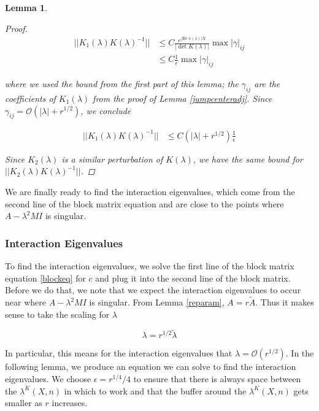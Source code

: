 \documentclass[12pt]{article}
\newtheorem{lemma}{Lemma}
\begin{document}
\begin{lemma}
\begin{proof}
\begin{align*}
||K_1(\lambda)K(\lambda)^{-1}|| &\leq 
C \frac{e^{|\text{Re }\nu(\lambda)|X}}{|\det K(\lambda)|} \max {|\gamma|_{ij}} \\
&\leq C \frac{1}{\epsilon} \max {|\gamma|_{ij}}
\end{align*}

where we used the bound from the first part of this lemma; the $\gamma_{ij}$ are the coefficients of $K_1(\lambda)$ from the proof of Lemma \ref{jumpcenteradj}. Since $\gamma_{ij} = \mathcal{O}(|\lambda| + r^{1/2})$, we conclude

\begin{align*}
||K_1(\lambda)K(\lambda)^{-1}|| &\leq C (|\lambda| + r^{1/2})\frac{1}{\epsilon}
\end{align*}

Since $K_2(\lambda)$ is a similar perturbation of $K(\lambda)$, we have the same bound for $||K_2(\lambda)K(\lambda)^{-1}||$.
\end{proof}
\end{lemma}

We are finally ready to find the interaction eigenvalues, which come from the second line of the block matrix equation and are close to the points where $A - \lambda^2 M I$ is singular.

\subsubsection{Interaction Eigenvalues}

To find the interaction eigenvalues, we solve the first line of the block matrix equation \eqref{blockeq} for $c$ and plug it into the second line of the block matrix. Before we do that, we note that we expect the interaction eigenvalues to occur near where $A - \lambda^2 M I$ is singular. From Lemma \ref{reparam}, $A = r \tilde{A}$. Thus it makes sense to take the scaling for $\lambda$

\[
\lambda = r^{1/2}\tilde{\lambda}
\]

In particular, this means for the interaction eigenvalues that $\lambda = \mathcal{O}(r^{1/2})$. In the following lemma, we produce an equation we can solve to find the interaction eigenvalues. We choose $\epsilon = r^{1/4}/4$ to ensure that there is always space between the $\lambda^K(X,n)$ in which to work and that the buffer around the $\lambda^K(X,n)$ gets smaller as $r$ increases.

\end{document}
